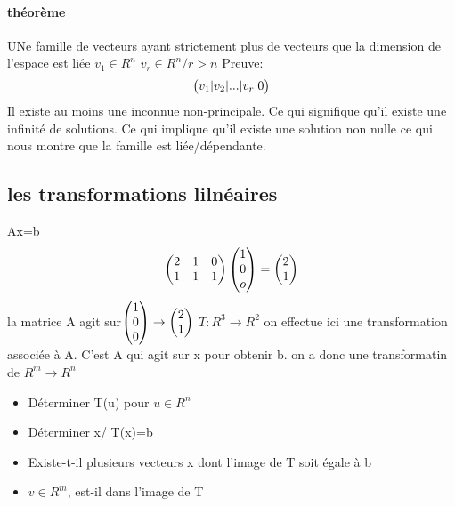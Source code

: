 \documentclass[a4paper,10pt]{article}
\begin{document}
\paragraph{théorème}
UNe famille de vecteurs ayant strictement plus de vecteurs que la dimension de l'espace est liée
\newline
$v_1\in R^n$ $v_r\in R^n/r>n$
\newline
Preuve:
\[
\begin{pmatrix}
v_1|v_2|...|v_r|0\cr
\end{pmatrix}
\]
\newline
Il existe au moins une inconnue non-principale. Ce qui signifique qu'il existe une infinité de solutions. Ce qui implique qu'il existe une solution non nulle ce qui nous montre que la famille est liée/dépendante.
\subsection{les transformations lilnéaires}
Ax=b
\[
\begin{pmatrix}
2&1&0\cr
1&1&1\cr
\end{pmatrix}
\begin{pmatrix}
1\cr
0\cr
o\cr
\end{pmatrix}
=
\begin{pmatrix}
2\cr
1\cr
\end{pmatrix}
\]
\newline
la matrice A agit sur$\begin{pmatrix}
1\cr
0\cr
0\cr
\end{pmatrix}
\rightarrow
\begin{pmatrix}
2\cr
1\cr
\end{pmatrix}$
\newline
$T:R^3\rightarrow R^2$
\newline
on effectue ici une transformation associée à A. C'est A qui agit sur x pour obtenir b. on a donc une transformatin de $R^m\rightarrow R^n$
\newline
\begin{itemize}
 \item Déterminer T(u) pour $u\in R^n$
 \item Déterminer x/ T(x)=b
 \item Existe-t-il plusieurs vecteurs x dont l'image de T soit égale à b
 \item $v\in R^m$, est-il dans l'image de T
\end{itemize}
\end{document}
